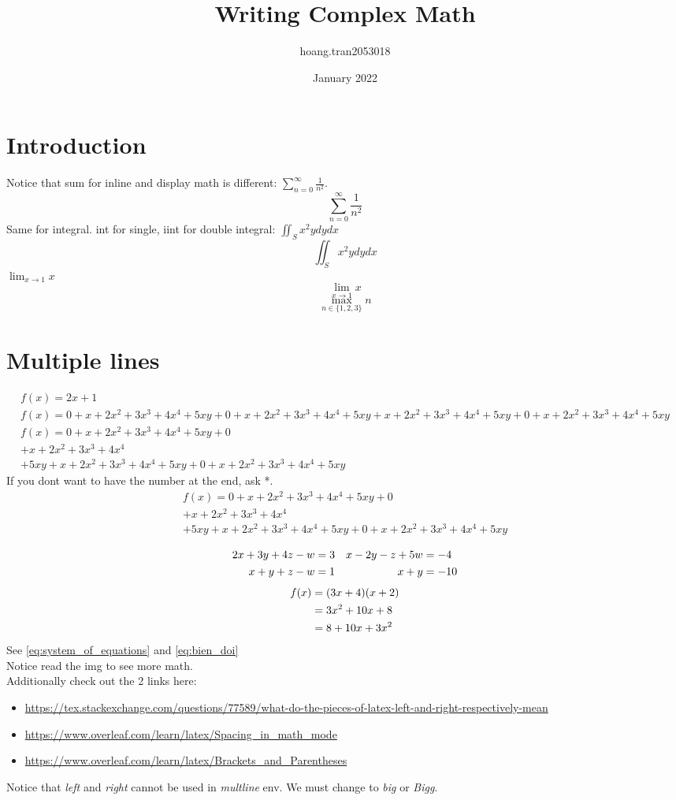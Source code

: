 \documentclass{article}
\title{Writing Complex Math}
\author{hoang.tran2053018 }
\date{January 2022}
\begin{document}
\maketitle

\section{Introduction}
Notice that sum for inline and display math is different: $\sum_{n=0}^{\infty}\frac{1}{n^2}$.
\[\sum_{n=0}^{\infty}\frac{1}{n^2}\]
Same for integral. int for single, iint for double integral: $\iint_{S}x^2ydydx$
\[\iint_{S}x^2ydydx\]
$\lim_{x \to 1}x$
\[\lim_{x \to 1}x\]
\[\max_{n \in \{1,2,3\}}n\]

\section{Multiple lines}
\begin{multline} %
    f(x)=2x+1\\
    f(x)=0+x+2x^2+3x^3+4x^4+5xy+0+x+2x^2+3x^3+4x^4+5xy+x+2x^2+3x^3+4x^4+5xy+0+x+2x^2+3x^3+4x^4+5xy\\
    f(x)=0+x+2x^2+3x^3+4x^4+5xy+0\\+x+2x^2+3x^3+4x^4\\+5xy+x+2x^2+3x^3+4x^4+5xy+0+x+2x^2+3x^3+4x^4+5xy
\end{multline}
If you dont want to have the number at the end, ask *.
\begin{multline*}
    f(x)=0+x+2x^2+3x^3+4x^4+5xy+0\\+x+2x^2+3x^3+4x^4\\+5xy+x+2x^2+3x^3+4x^4+5xy+0+x+2x^2+3x^3+4x^4+5xy
\end{multline*}

\begin{align}\label{eq:system_of_equations}
    2x+3y+4z-w &=3 & x-2y-z+5w &=-4\\
    x+y+z-w &= 1 & x+y &= -10 \notag %
\end{align}
\begin{align}\label{eq:bien_doi}
    f(x) &=(3x+4)(x+2)\\
    &=3x^2+10x+8 \notag \\
    &=8+10x+3x^2 \notag
\end{align}
See \eqref{eq:system_of_equations} and \eqref{eq:bien_doi} \\
Notice read the img to see more math.\\
Additionally check out the 2 links here:
\begin{itemize}
    \item \url{https://tex.stackexchange.com/questions/77589/what-do-the-pieces-of-latex-left-and-right-respectively-mean}
    \item \url{https://www.overleaf.com/learn/latex/Spacing_in_math_mode}
    \item \url{https://www.overleaf.com/learn/latex/Brackets_and_Parentheses}
\end{itemize}
Notice that \textit{left} and \textit{right} cannot be used in \textit{multline} env. We must change to \textit{big} or \textit{Bigg}.
\end{document}
